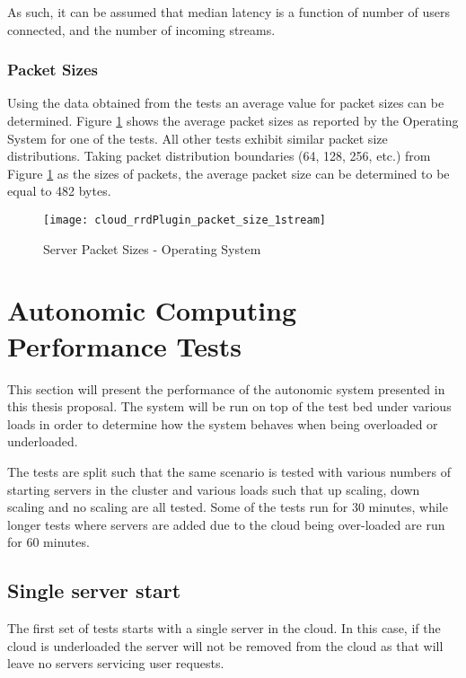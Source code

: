 As such, it can be assumed that median latency is a function of number of users connected, and the number of incoming streams.

\subsubsection{Packet Sizes}

Using the data obtained from the tests an average value for packet sizes can be determined. Figure \ref{fig:1serv1streampacketsizes} shows the average packet sizes as reported by the Operating System for one of the tests. All other tests exhibit similar packet size distributions. Taking packet distribution boundaries (64, 128, 256, etc.) from Figure \ref{fig:1serv1streampacketsizes} as the sizes of packets, the average packet size can be determined to be equal to 482 bytes.

\begin{figure}
	\centering
		\texttt{[image: cloud\_rrdPlugin\_packet\_size\_1stream]}
	\caption{Server Packet Sizes - Operating System}
	\label{fig:1serv1streampacketsizes}
\end{figure}

\clearpage

\section{Autonomic Computing Performance Tests}

This section will present the performance of the autonomic system presented in this thesis proposal. The system will be run on top of the test bed under various loads in order to determine how the system behaves when being overloaded or underloaded.

The tests are split such that the same scenario is tested with various numbers of starting servers in the cluster and various loads such that up scaling, down scaling and no scaling are all tested. Some of the tests run for 30 minutes, while longer tests where servers are added due to the cloud being over-loaded are run for 60 minutes.

\subsection{Single server start}

The first set of tests starts with a single server in the cloud. In this case, if the cloud is underloaded the server will not be removed from the cloud as that will leave no servers servicing user requests.

